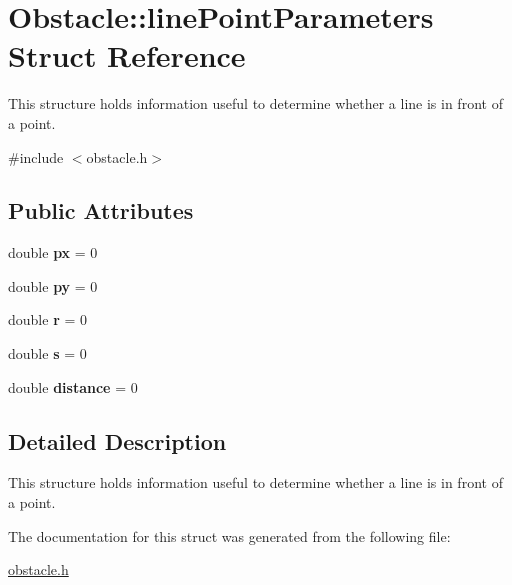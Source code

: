 \hypertarget{struct_obstacle_1_1line_point_parameters}{\section{Obstacle\-:\-:line\-Point\-Parameters Struct Reference}
\label{struct_obstacle_1_1line_point_parameters}
}


This structure holds information useful to determine whether a line is in front of a point.  




{\ttfamily \#include $<$obstacle.\-h$>$}

\subsection*{Public Attributes}
\begin{DoxyCompactItemize}
\item 
\hypertarget{struct_obstacle_1_1line_point_parameters_ab452ffdd1bb76eb876753f434ca8f0f4}{double {\bfseries px} = 0}\label{struct_obstacle_1_1line_point_parameters_ab452ffdd1bb76eb876753f434ca8f0f4}

\item 
\hypertarget{struct_obstacle_1_1line_point_parameters_a8a82462c3097268c80e6e14ca89135a0}{double {\bfseries py} = 0}\label{struct_obstacle_1_1line_point_parameters_a8a82462c3097268c80e6e14ca89135a0}

\item 
\hypertarget{struct_obstacle_1_1line_point_parameters_a74d54c87aadd4ded92f10557228e95cd}{double {\bfseries r} = 0}\label{struct_obstacle_1_1line_point_parameters_a74d54c87aadd4ded92f10557228e95cd}

\item 
\hypertarget{struct_obstacle_1_1line_point_parameters_af03427d0465b22049a69c3447c6ddc50}{double {\bfseries s} = 0}\label{struct_obstacle_1_1line_point_parameters_af03427d0465b22049a69c3447c6ddc50}

\item 
\hypertarget{struct_obstacle_1_1line_point_parameters_aa97335744a9f8d1715d327a503d056b1}{double {\bfseries distance} = 0}\label{struct_obstacle_1_1line_point_parameters_aa97335744a9f8d1715d327a503d056b1}

\end{DoxyCompactItemize}


\subsection{Detailed Description}
This structure holds information useful to determine whether a line is in front of a point. 

The documentation for this struct was generated from the following file\-:\begin{DoxyCompactItemize}
\item 
\hyperlink{obstacle_8h}{obstacle.\-h}\end{DoxyCompactItemize}
